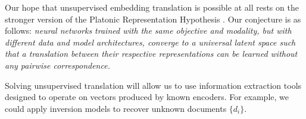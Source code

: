 Our hope that unsupervised embedding translation is possible at all rests on the stronger version of the Platonic Representation Hypothesis \citep{huh2024platonicrepresentationhypothesis}.  Our conjecture is as follows:
\emph{neural networks trained with the same objective and modality, but with different data and model architectures, converge to a universal latent space such that a translation between their respective representations can be learned without any pairwise correspondence.} 



 Solving unsupervised translation will allow us to use information extraction tools designed to operate on vectors produced by known encoders. For example, we could apply inversion models \citep{morris2023textembeddingsrevealalmost, zhang2025universalzeroshotembeddinginversion} to recover unknown documents $\{d_i\}$.

